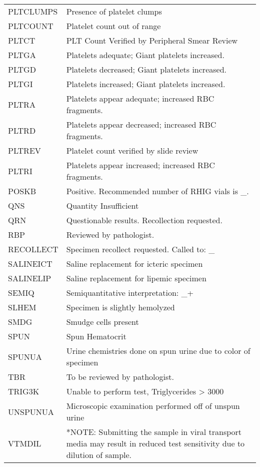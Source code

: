 \begin{fullwidth}
\begin{longtable}{p{.20\linewidth} p{.75\linewidth}}
PLTCLUMPS    & Presence of platelet clumps\\
PLTCOUNT     & Platelet count out of range\\
PLTCT        & PLT Count Verified by Peripheral Smear Review\\
PLTGA        & Platelets adequate; Giant platelets increased.\\
PLTGD        & Platelets decreased; Giant platelets increased.\\
PLTGI        & Platelets increased; Giant platelets increased.\\
PLTRA        & Platelets appear adequate; increased RBC fragments.\\
PLTRD        & Platelets appear decreased; increased RBC fragments.\\
PLTREV       & Platelet count verified by slide review\\
PLTRI        & Platelets appear increased; increased RBC fragments.\\
POSKB        & Positive. Recommended number of RHIG vials is \_.\\
QNS          & Quantity Insufficient\\
QRN          & Questionable results. Recollection requested.\\
RBP          & Reviewed by pathologist.\\
RECOLLECT    & Specimen recollect requested.  Called to: \_\\
SALINEICT    & Saline replacement for icteric specimen\\
SALINELIP    & Saline replacement for lipemic specimen\\
SEMIQ        & Semiquantitative interpretation: \_+\\
SLHEM        & Specimen is slightly hemolyzed\\
SMDG         & Smudge cells present\\
SPUN         & Spun Hematocrit\\
SPUNUA       & Urine chemistries done on spun urine due to color of specimen\\
TBR          & To be reviewed by pathologist.\\
TRIG3K       & Unable to perform test, Triglycerides > 3000\\
UNSPUNUA     & Microscopic examination performed off of unspun urine\\
VTMDIL       & *NOTE: Submitting the sample in viral transport media may result in reduced test sensitivity due to dilution of sample.\\

\end{longtable}
\end{fullwidth}
